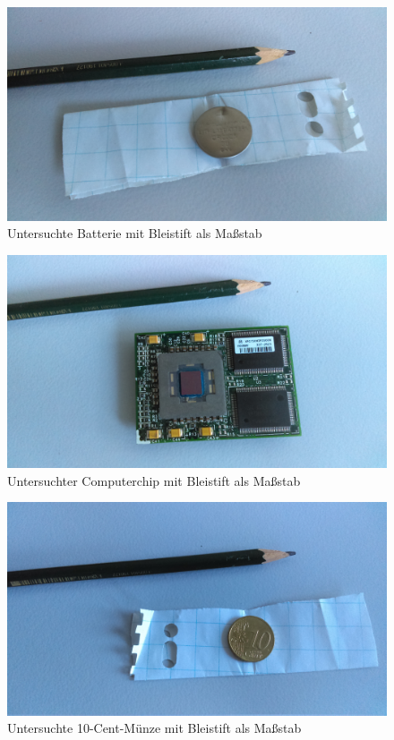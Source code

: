 \documentclass[a4paper,14pt]{article}
\begin{document}
\begin{figure}[H]
\centering
\includegraphics[width=\textwidth]{../Photos/Batterie.jpg}
\caption{Untersuchte Batterie mit Bleistift als Maßstab}
\label{Batterie}
\end{figure}

\begin{figure}[H]
\centering
\includegraphics[width=\textwidth]{../Photos/Chip.jpg}
\caption{Untersuchter Computerchip mit Bleistift als Maßstab}
\label{Stein}
\end{figure}

\begin{figure}[H]
\centering
\includegraphics[width=\textwidth]{../Photos/10ct.jpg}
\caption{Untersuchte 10-Cent-Münze mit Bleistift als Maßstab}
\label{10ct}
\end{figure}
\end{document}
